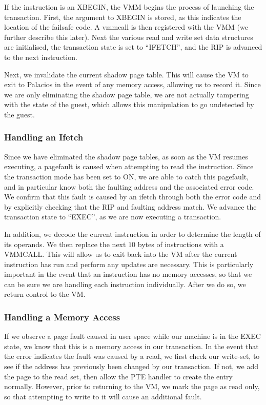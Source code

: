 \documentclass{acm_proc_article-sp}
\begin{document}
If the instruction is an XBEGIN, the VMM begins the process of launching the
transaction. First, the argument to XBEGIN is stored, as this indicates the 
location of the failsafe code. A vmmcall is then registered with the VMM
(we further describe this later). Next the various read and write set data
structures are initialised, the transaction state is set to ``IFETCH'', and the
RIP is advanced to the next instruction.

Next, we invalidate the current shadow page table. This will cause the VM to 
exit to Palacios in the event of any memory access, allowing us to record it.
Since we are only eliminating the shadow page table, we are not actually
tampering with the state of the guest, which allows this manipulation to go
undetected by the guest.

\subsubsection{Handling an Ifetch}

Since we have eliminated the shadow page tables, as soon as the VM resumes
executing, a pagefault is caused when attempting to read the instruction.
Since the transaction mode has been set to ON, we are able to catch this
pagefault, and in particular know both the faulting address and the associated
error code. We confirm that this fault is caused by an ifetch through both
the error code and by explicitly checking that the RIP and faulting address
match. We advance the transaction state to ``EXEC'', as we are now executing
a transaction. 
  
In addition, we decode the current instruction in order to determine the length
of its operands. We then replace the next $10$ bytes of instructions with
a VMMCALL. This will allow us to exit back into the VM after the current
instruction has run and perform any updates are necessary. This is particularly
important in the event that an instruction has no memory accesses, so that we
can be sure we are handling each instruction individually. After we do so, 
we return control to the VM.

\subsubsection{Handling a Memory Access}

If we observe a page fault caused in user space while our machine is in the
EXEC state, we know that this is a memory access in our transaction. In the 
event that the error indicates the fault was caused by a read, we first check
our write-set, to see if the address has previously been changed by our 
transaction. If not, we add the page to the read set, then allow the PTE
handler to create the entry normally. However, prior to returning to the VM,
we mark the page as read only, so that attempting to write to it will cause
an additional fault.
\end{document}
